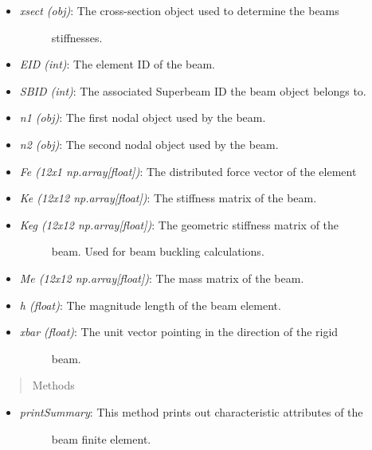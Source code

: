 \documentclass[letterpaper,10pt,english]{sphinxmanual}
\begin{document}
\begin{fulllineitems}
\begin{itemize}
\begin{description}
\end{description}

\item {} \begin{description}
\item[{\emph{xsect (obj)}: The cross-section object used to determine the beams}] \leavevmode
stiffnesses.

\end{description}

\item {} 
\emph{EID (int)}: The element ID of the beam.

\item {} 
\emph{SBID (int)}: The associated Superbeam ID the beam object belongs to.

\item {} 
\emph{n1 (obj)}: The first nodal object used by the beam.

\item {} 
\emph{n2 (obj)}: The second nodal object used by the beam.

\item {} 
\emph{Fe (12x1 np.array{[}float{]})}: The distributed force vector of the element

\item {} 
\emph{Ke (12x12 np.array{[}float{]})}: The stiffness matrix of the beam.

\item {} \begin{description}
\item[{\emph{Keg (12x12 np.array{[}float{]})}: The geometric stiffness matrix of the}] \leavevmode
beam. Used for beam buckling calculations.

\end{description}

\item {} 
\emph{Me (12x12 np.array{[}float{]})}: The mass matrix of the beam.

\item {} 
\emph{h (float)}: The magnitude length of the beam element.

\item {} \begin{description}
\item[{\emph{xbar (float)}: The unit vector pointing in the direction of the rigid}] \leavevmode
beam.

\end{description}

\end{itemize}
\begin{quote}\begin{description}
\item[{Methods}] \leavevmode
\end{description}\end{quote}
\begin{itemize}
\item {} \begin{description}
\item[{\emph{printSummary}: This method prints out characteristic attributes of the}] \leavevmode
beam finite element.


\end{description}
\end{itemize}
\end{fulllineitems}
\end{document}
